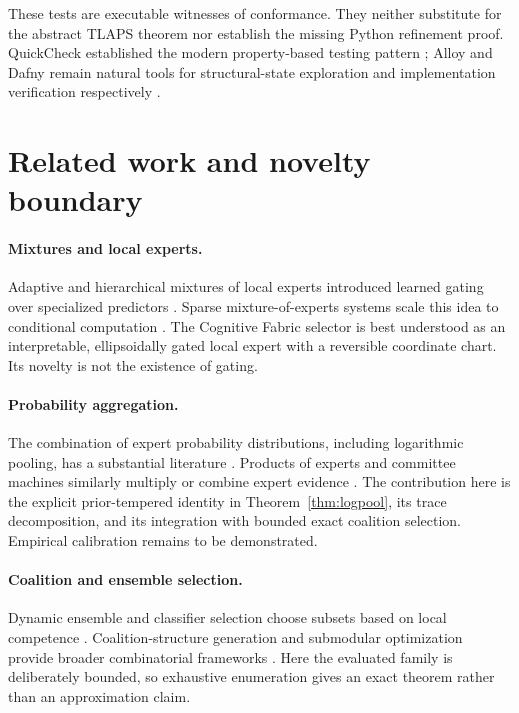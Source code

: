 \documentclass[11pt]{article}
\theoremstyle{definition}
\theoremstyle{plain}
\begin{document}
These tests are executable witnesses of conformance.  They neither substitute
for the abstract TLAPS theorem nor establish the missing Python refinement
proof.  QuickCheck established the modern property-based testing pattern
\cite{claessen2000}; Alloy and Dafny remain natural tools for
structural-state exploration and implementation verification respectively
\cite{jackson2002,leino2010}.

\section{Related work and novelty boundary}

\paragraph{Mixtures and local experts.}
Adaptive and hierarchical mixtures of local experts introduced learned gating
over specialized predictors \cite{jacobs1991,jordan1994}.  Sparse
mixture-of-experts systems scale this idea to conditional computation
\cite{shazeer2017}.  The Cognitive Fabric selector is best understood as an
interpretable, ellipsoidally gated local expert with a reversible coordinate
chart.  Its novelty is not the existence of gating.

\paragraph{Probability aggregation.}
The combination of expert probability distributions, including logarithmic
pooling, has a substantial literature \cite{genest1986}.  Products of experts
and committee machines similarly multiply or combine expert evidence
\cite{hinton2002,tresp2000}.  The contribution here is the explicit
prior-tempered identity in Theorem~\ref{thm:logpool}, its trace decomposition,
and its integration with bounded exact coalition selection.  Empirical
calibration remains to be demonstrated.

\paragraph{Coalition and ensemble selection.}
Dynamic ensemble and classifier selection choose subsets based on local
competence \cite{woods1997,caruana2004}.  Coalition-structure generation and
submodular optimization provide broader combinatorial frameworks
\cite{sandholm1999,nemhauser1978}.  Here the evaluated family is deliberately
bounded, so exhaustive enumeration gives an exact theorem rather than an
approximation claim.
\end{document}
